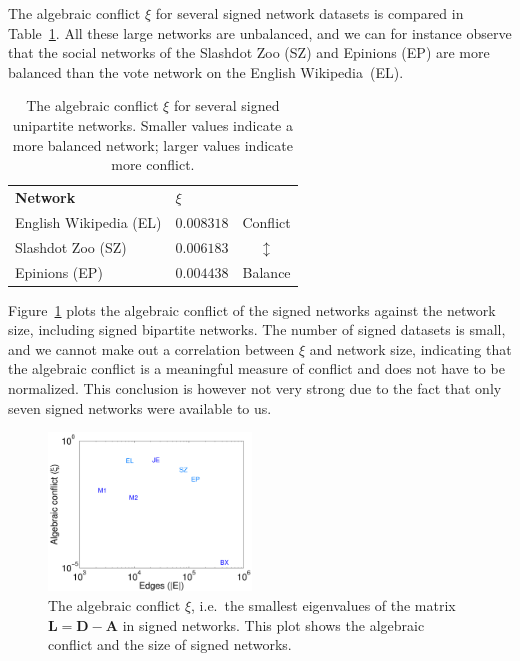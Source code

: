 \documentclass[11pt,a4paper]{book}
\newcommand{\wTwo}{0.48}
\begin{document}
The algebraic conflict $\xi$ for several signed network datasets is
compared in 
Table~\ref{tab:smallest}. 
All these large networks are unbalanced, and we
can for instance observe that the social networks of the Slashdot Zoo
(\textsf{SZ}) and Epinions (\textsf{EP}) are more balanced than
the vote network on the English Wikipedia~(\textsf{EL}). 

\begin{table}
  \centering
  \caption{
    The algebraic conflict $\xi$ for several signed unipartite networks.
    Smaller values indicate a more balanced network; larger values
    indicate more conflict.
  }
  \begin{tabular}{ l l c }
    \cmidrule{1-2}
    \textbf{Network} &  $\xi$ \\ 
    \cmidrule{1-2}
    English Wikipedia (\textsf{EL})  & $0.008318$
    & Conflict \\
    Slashdot Zoo (\textsf{SZ}) & $0.006183$
    & $\updownarrow$ \\
    Epinions (\textsf{EP}) & $0.004438$ & Balance \\
    \cmidrule{1-2}
  \end{tabular}
  \label{tab:smallest}
\end{table}

Figure~\ref{fig:scatter.radius-lu_sparsity} plots the algebraic conflict
of the signed networks against the network size, including signed
bipartite networks.  The number of signed
datasets is small, and we cannot make out a correlation between $\xi$
and network size, indicating that the algebraic conflict is a meaningful
measure of conflict and does not have to be normalized.  This conclusion
is however not very strong due to the fact that only seven signed
networks were available to us.

\begin{figure}[h!]
  \centering
  \includegraphics[width=\wTwo\textwidth]{img-st/scatter.radius_ls.a}
  \caption{
    The algebraic conflict $\xi$, i.e.\ the smallest eigenvalues of the matrix
    $\mathbf L = \mathbf D - \mathbf A$ in
    signed networks.  This plot shows the algebraic conflict and the
    size of signed networks.
  }
  \label{fig:scatter.radius-lu_sparsity}
\end{figure}
\end{document}
